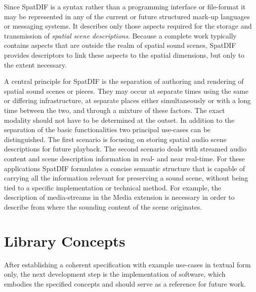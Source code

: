 \documentclass{article}
\begin{document}
Since SpatDIF is a syntax rather than a programming interface or file-format it may be represented in any of the current or future structured mark-up languages or messaging systems.
It describes only those aspects required for the storage and transmission of \emph{spatial scene descriptions}.
Because a complete work typically contains aspects that are outside the realm of spatial sound scenes, SpatDIF provides descriptors to link these aspects to the spatial dimensions, but only to the extent necessary.

A central principle for SpatDIF is the separation of authoring and rendering of spatial sound scenes or pieces.
They may occur at separate times using the same or differing infrastructure, at separate places either simultaneously or with a long time between the two, and through a mixture of these factors. 
The exact modality should not have to be determined at the outset.
In addition to the separation of the basic functionalities two principal use-cases can be distinguished.
The first scenario is focusing on storing spatial audio scene descriptions for future playback. 
The second scenario deals with streamed audio content and scene description information in real- and near real-time.
For these applications SpatDIF formulates a concise semantic structure that is capable of carrying all the information relevant for preserving a sound scene, without being tied to a specific implementation or technical method.
For example, the description of media-streams in the Media extension is necessary in order to describe from where the sounding content of the scene originates.

\section{Library Concepts}\label{sec:libspatdif_concepts}

After establishing a coherent specification with example use-cases in textual form only, the next development step is the implementation of software, which embodies the specified concepts and should serve as a reference for future work.
\end{document}
